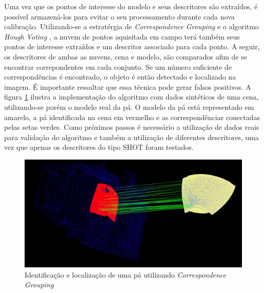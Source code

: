 Uma vez que os pontos de interesse do modelo e seus descritores são extraídos, é
possível armazená-los para evitar o seu processamento  durante cada nova
calibração. Utilizando-se a estratérgia de
\textit{Correspondence Grouping} e o algoritmo \textit{Hough Voting}
\cite{Tombari2010a}, a nuvem de pontos aquisitada em campo terá também seus
pontos de interesse extraídos e um descritor associado para cada ponto. A
seguir, os descritores de ambas as nuvens, cena e modelo, são comparados afim de
se encontrar correpondentes em cada conjunto. Se um número suficiente de
correspondências é encontrado, o objeto é então detectado e localizado na
imagem. É importante ressaltar que essa técnica pode gerar falsos positivos. A
figura \ref{fig::correspondence} ilustra a implementação do algoritmo com 
dados sintéticos de uma cena, utilizando-se porém o modelo real da pá. O modelo
da pá está representado em amarelo, a pá identificada na cena em vermelho e as correspondências
conectadas pelas setas verdes.
Como próximos passos é necessário a utilização de dados reais para validação do
algoritmo e também a utilização de diferentes descritores, uma vez que apenas os
descritores do tipo SHOT foram testados.

\begin{figure}[h!]
   \centering
   \includegraphics[width=0.99\columnwidth]{figs/localizacao/correspondence}
   \caption{Identificação e localização de uma pá utilizando
   \textit{Correspondence Grouping}}
   \label{fig::correspondence}
\end{figure}



